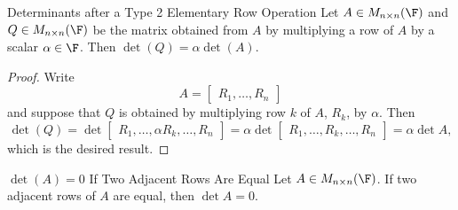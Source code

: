 \documentclass[linearalgebra]{subfiles}
\begin{document}
    \begin{cor}{Determinants after a Type 2 Elementary Row Operation}
        Let $A\in M_{n\times n}(\F)$ and $Q\in M_{n\times n}(\F)$ be the matrix obtained from $A$ by multiplying a row of $A$ by a scalar $\alpha\in \F$. Then $\det(Q) = \alpha\det(A)$.
    \end{cor}	

    \begin{proof}
        Write
        \begin{equation*}
            A = 
            \begin{bmatrix}
                R_1, \ldots, R_n
            \end{bmatrix}
        \end{equation*}
        and suppose that $Q$ is obtained by multiplying row $k$ of $A$, $R_k$, by $\alpha$. Then
        \begin{equation*}
            \det(Q) = 
            \det 
            \begin{bmatrix}
                R_1, \ldots, \alpha R_k, \ldots, R_n
            \end{bmatrix}
            = 
            \alpha \det 
            \begin{bmatrix}
                R_1, \ldots, R_k, \ldots, R_n
            \end{bmatrix}
            = \alpha \det A,
        \end{equation*}
        which is the desired result.
    \end{proof}

    \begin{lemma}{$\det(A) = 0$ If Two Adjacent Rows Are Equal}
        Let $A\in M_{n\times n}(\F)$. If two adjacent rows of $A$ are equal, then $\det A = 0$.
    \end{lemma}
\end{document}
